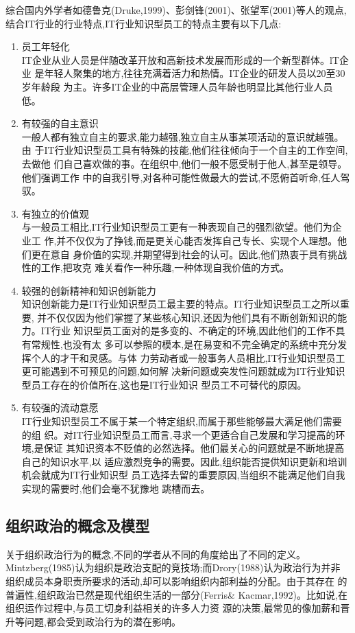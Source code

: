 \documentclass[10pt,a4paper]{article}
\begin{document}
\begin{CJK*}{UTF8}{gkai}
综合国内外学者如德鲁克(Druke,1999)、彭剑锋(2001)、张望军(2001)等人的观点,结合IT行业的行业特点,IT行业知识型员工的特点主要有以下几点\cite{3}:
\begin{enumerate}
\item 员工年轻化\\
IT企业从业人员是伴随改革开放和高新技术发展而形成的一个新型群体。lT企业
是年轻人聚集的地方,往往充满着活力和热情。IT企业的研发人员以20至30岁年龄段
为主。许多IT企业的中高层管理人员年龄也明显比其他行业人员低。
\item 有较强的自主意识\\
一般人都有独立自主的要求,能力越强,独立自主从事某项活动的意识就越强。由
于IT行业知识型员工具有特殊的技能,他们往往倾向于一个自主的工作空间,去做他
们自己喜欢做的事。在组织中,他们一般不愿受制于他人,甚至是领导。他们强调工作
中的自我引导,对各种可能性做最大的尝试,不愿俯首听命,任人驾驭。
\item 有独立的价值观\\
与一般员工相比,IT行业知识型员工更有一种表现自己的强烈欲望。他们为企业工
作,并不仅仅为了挣钱,而是更关心能否发挥自己专长、实现个人理想。他们更在意自
身价值的实现,并期望得到社会的认可。因此,他们热衷于具有挑战性的工作,把攻克
难关看作一种乐趣,一种体现自我价值的方式。
\item 较强的创新精神和知识创新能力\\
知识创新能力是IT行业知识型员工最主要的特点。IT行业知识型员工之所以重要,
并不仅仅因为他们掌握了某些核心知识,还因为他们具有不断创新知识的能力。IT行业
知识型员工面对的是多变的、不确定的环境,因此他们的工作不具有常规性,也没有太
多可以参照的模本,是在易变和不完全确定的系统中充分发挥个人的才干和灵感。与体
力劳动者或一般事务人员相比,IT行业知识型员工更可能遇到不可预见的问题,如何解
决新问题或突发性问题就成为IT行业知识型员工存在的价值所在,这也是IT行业知识
型员工不可替代的原因。
\item 有较强的流动意愿\\
IT行业知识型员工不属于某一个特定组织,而属于那些能够最大满足他们需要的组
织。对IT行业知识型员工而言,寻求一个更适合自己发展和学习提高的环境,是保证
其知识资本不贬值的必然选择。他们最关心的问题就是不断地提高自己的知识水平,以
适应激烈竞争的需要。因此,组织能否提供知识更新和培训机会就成为IT行业知识型
员工选择去留的重要原因,当组织不能满足他们自我实现的需要时,他们会毫不犹豫地
跳槽而去\cite{4}。
\end{enumerate}

\subsection{组织政治的概念及模型}
关于组织政治行为的概念,不同的学者从不同的角度给出了不同的定义。
Mintzberg(1985)认为组织是政治支配的竞技场;而Drory(1988)认为政治行为并非
组织成员本身职责所要求的活动,却可以影响组织内部利益的分配。由于其存在
的普遍性,组织政治已然是现代组织生活的一部分(Ferris\&{}
Kacmar,1992)。比如说,在组织运作过程中,与员工切身利益相关的许多人力资
源的决策,最常见的像加薪和晋升等问题,都会受到政治行为的潜在影响。



\end{CJK*}
\end{document}

